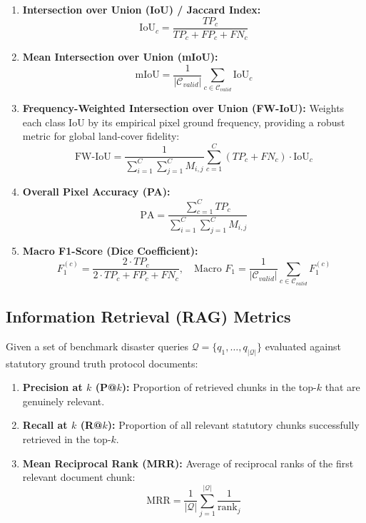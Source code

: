 \begin{enumerate}
    \item \textbf{Intersection over Union (IoU) / Jaccard Index:}
    \begin{equation}
        \text{IoU}_c = \frac{TP_c}{TP_c + FP_c + FN_c}
    \end{equation}
    \item \textbf{Mean Intersection over Union (mIoU):}
    \begin{equation}
        \text{mIoU} = \frac{1}{|\mathcal{C}_{valid}|} \sum_{c \in \mathcal{C}_{valid}} \text{IoU}_c
    \end{equation}
    \item \textbf{Frequency-Weighted Intersection over Union (FW-IoU):} Weights each class IoU by its empirical pixel ground frequency, providing a robust metric for global land-cover fidelity:
    \begin{equation}
        \text{FW-IoU} = \frac{1}{\sum_{i=1}^C \sum_{j=1}^C M_{i, j}} \sum_{c=1}^C (TP_c + FN_c) \cdot \text{IoU}_c
    \end{equation}
    \item \textbf{Overall Pixel Accuracy (PA):}
    \begin{equation}
        \text{PA} = \frac{\sum_{c=1}^C TP_c}{\sum_{i=1}^C \sum_{j=1}^C M_{i, j}}
    \end{equation}
    \item \textbf{Macro F1-Score (Dice Coefficient):}
    \begin{equation}
        F_1^{(c)} = \frac{2 \cdot TP_c}{2 \cdot TP_c + FP_c + FN_c}, \quad \text{Macro } F_1 = \frac{1}{|\mathcal{C}_{valid}|} \sum_{c \in \mathcal{C}_{valid}} F_1^{(c)}
    \end{equation}
\end{enumerate}

\subsection{Information Retrieval (RAG) Metrics}
Given a set of benchmark disaster queries $\mathcal{Q} = \{q_1, \dots, q_{|\mathcal{Q}|}\}$ evaluated against statutory ground truth protocol documents:
\begin{enumerate}
    \item \textbf{Precision at $k$ (P@$k$):} Proportion of retrieved chunks in the top-$k$ that are genuinely relevant.
    \item \textbf{Recall at $k$ (R@$k$):} Proportion of all relevant statutory chunks successfully retrieved in the top-$k$.
    \item \textbf{Mean Reciprocal Rank (MRR):} Average of reciprocal ranks of the first relevant document chunk:
    \begin{equation}
        \text{MRR} = \frac{1}{|\mathcal{Q}|} \sum_{j=1}^{|\mathcal{Q}|} \frac{1}{\text{rank}_j}
    \end{equation}
\end{enumerate}


